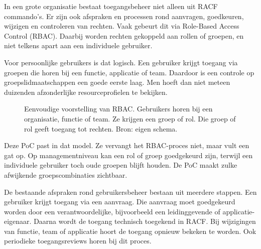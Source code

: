 In een grote organisatie bestaat toegangsbeheer niet alleen uit RACF commando's. Er zijn ook afspraken en processen rond aanvragen, goedkeuren, wijzigen en controleren van rechten. Vaak gebeurt dit via Role-Based Access Control (RBAC). Daarbij worden rechten gekoppeld aan rollen of groepen, en niet telkens apart aan een individuele gebruiker.

Voor persoonlijke gebruikers is dat logisch. Een gebruiker krijgt toegang via groepen die horen bij een functie, applicatie of team. Daardoor is een controle op groepslidmaatschappen een goede eerste laag. Men hoeft dan niet meteen duizenden afzonderlijke resourceprofielen te bekijken.

\begin{figure}[htbp]
	\centering
	\caption[RBAC in eenvoudige vorm]{Eenvoudige voorstelling van RBAC. Gebruikers horen bij een organisatie, functie of team. Ze krijgen een groep of rol. Die groep of rol geeft toegang tot rechten. Bron: eigen schema.}
	\label{fig:rbac-eenvoudig}
\end{figure}

Deze PoC past in dat model. Ze vervangt het RBAC-proces niet, maar vult een gat op. Op managementniveau kan een rol of groep goedgekeurd zijn, terwijl een individuele gebruiker toch oude groepen blijft houden. De PoC maakt zulke afwijkende groepscombinaties zichtbaar.

De bestaande afspraken rond gebruikersbeheer bestaan uit meerdere stappen. Een gebruiker krijgt toegang via een aanvraag. Die aanvraag moet goedgekeurd worden door een verantwoordelijke, bijvoorbeeld een leidinggevende of applicatie-eigenaar. Daarna wordt de toegang technisch toegekend in RACF. Bij wijzigingen van functie, team of applicatie hoort de toegang opnieuw bekeken te worden. Ook periodieke toegangsreviews horen bij dit proces.

